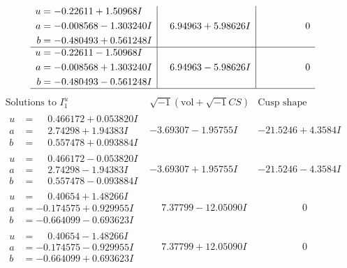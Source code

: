 \documentclass[1p]{elsarticle_modified}
\theoremstyle{definition}
\newcommand{\I}{\sqrt{-1}}
\begin{document}
$$\begin{array}{c|c|c}
\begin{aligned}
u &= -0.22611 + 1.50968 I \\
a &= -0.008568 - 1.303240 I \\
b &= -0.480493 + 0.561248 I\end{aligned}
 & \phantom{-}6.94963 + 5.98626 I & \phantom{-0.000000 } 0 \\ \hline\begin{aligned}
u &= -0.22611 - 1.50968 I \\
a &= -0.008568 + 1.303240 I \\
b &= -0.480493 - 0.561248 I\end{aligned}
 & \phantom{-}6.94963 - 5.98626 I & \phantom{-0.000000 } 0\\
 \hline 
 \end{array}$$\newpage$$\begin{array}{c|c|c}  
\text{Solutions to }I^u_{1}& \I (\text{vol} + \sqrt{-1}CS) & \text{Cusp shape}\\
 \hline 
\begin{aligned}
u &= \phantom{-}0.466172 + 0.053820 I \\
a &= \phantom{-}2.74298 + 1.94383 I \\
b &= \phantom{-}0.557478 + 0.093884 I\end{aligned}
 & -3.69307 - 1.95755 I & -21.5246 + 4.3584 I \\ \hline\begin{aligned}
u &= \phantom{-}0.466172 - 0.053820 I \\
a &= \phantom{-}2.74298 - 1.94383 I \\
b &= \phantom{-}0.557478 - 0.093884 I\end{aligned}
 & -3.69307 + 1.95755 I & -21.5246 - 4.3584 I \\ \hline\begin{aligned}
u &= \phantom{-}0.40654 + 1.48266 I \\
a &= -0.174575 + 0.929955 I \\
b &= -0.664099 - 0.693623 I\end{aligned}
 & \phantom{-}7.37799 - 12.05090 I & \phantom{-0.000000 } 0 \\ \hline\begin{aligned}
u &= \phantom{-}0.40654 - 1.48266 I \\
a &= -0.174575 - 0.929955 I \\
b &= -0.664099 + 0.693623 I\end{aligned}
 & \phantom{-}7.37799 + 12.05090 I & \phantom{-0.000000 } 0 \\ \hline\begin{aligned}

\end{aligned}
\end{array}$$
\end{document}
